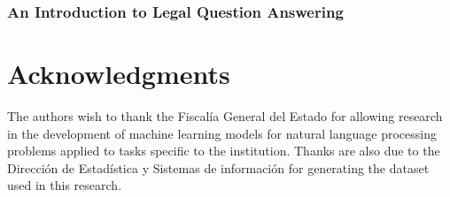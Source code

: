 \documentclass[onecolumn, journal, english, 12pt, a4paper]{IEEEtran} %
\theoremstyle{definition}
\begin{document}
\subsubsection{An Introduction to Legal Question Answering}
\label{sec:an-intr-legal-qa-paper}








\section*{Acknowledgments}

The authors wish to thank the Fiscalía General del Estado for allowing
research in the development of machine learning models for natural
language processing problems applied to tasks specific to the
institution. Thanks are also due to the Dirección de Estadística y
Sistemas de información for generating the dataset used in this
research.

\ifCLASSOPTIONcaptionsoff
  \newpage
\fi





%
%
%


\end{document}
